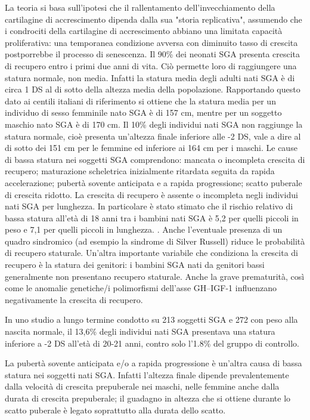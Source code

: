 La teoria si basa sull'ipotesi che il rallentamento dell'invecchiamento della cartilagine di accrescimento dipenda dalla sua "storia replicativa", assumendo che i condrociti della cartilagine di accrescimento abbiano una limitata capacità proliferativa: una temporanea condizione avversa con diminuito tasso di crescita postporrebbe il processo di senescenza.
Il 90\% dei neonati SGA presenta crescita di recupero entro i primi due anni di
vita\cite{karlberg1995growth}. Ciò permette loro di raggiungere una statura normale, non media. Infatti la statura media degli adulti nati SGA è di circa 1 DS al di sotto della altezza 
media della popolazione\cite{leger1997reduced}. Rapportando questo dato ai centili italiani di riferimento %
si ottiene che la statura media per un individuo di sesso femminile nato SGA è di 157 cm, mentre per un soggetto maschio nato SGA è di 170 cm. 
Il 10\% degli individui nati SGA non raggiunge la statura normale, cioè presenta un'altezza finale inferiore alle -2 DS, vale a dire al di sotto dei 151 cm per le femmine ed inferiore ai 164 cm per i maschi. 
Le cause di bassa statura nei soggetti SGA comprendono: mancata o incompleta crescita di recupero; maturazione scheletrica inizialmente ritardata seguita da rapida accelerazione; pubertà sovente anticipata e a rapida progressione; scatto puberale di crescita ridotto. 
La crescita di recupero è assente o incompleta negli individui nati SGA per lunghezza. In particolare è stato stimato che il rischio relativo di bassa statura all'età di 18 anni tra i bambini nati SGA è 5,2 per quelli 
piccoli in peso e 7,1 per quelli piccoli in lunghezza. \cite{cianfarani2006hormonal}. Anche l'eventuale presenza di un quadro sindromico (ad esempio la sindrome di Silver Russell) riduce le probabilità di recupero staturale. Un'altra importante variabile che condiziona la crescita di recupero è la statura dei genitori: i bambini SGA nati da genitori bassi generalmente non presentano recupero staturale. Anche la grave prematurità, così come le anomalie genetiche/i polimorfismi dell'asse GH--IGF-1 influenzano negativamente la crescita di recupero. 
  



  


 In uno studio
a lungo termine condotto su 213 soggetti SGA e 272 con peso alla nascita normale, il 
13,6\% degli individui nati SGA presentava una statura inferiore a -2 DS all'età di
20-21 anni, contro solo l'1.8\% del gruppo di controllo.









La pubertà sovente anticipata e/o a rapida progressione è un'altra causa di bassa statura nei soggetti nati SGA. Infatti l'altezza finale dipende prevalentemente dalla velocità di crescita prepuberale nei maschi, nelle femmine anche dalla durata di crescita prepuberale; il guadagno in altezza che si ottiene durante lo scatto puberale è legato soprattutto alla durata dello scatto\cite{gasser1985human}.

